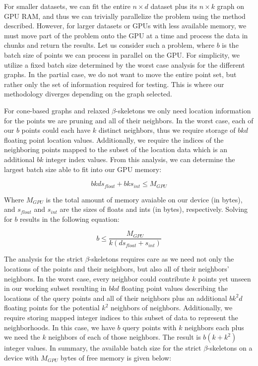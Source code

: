 For smaller datasets, we can fit the entire $n \times d$ dataset plus its $n \times k$ graph on GPU RAM, and thus we can trivially parallelize the problem using the method described.
%
However, for larger datasets or GPUs with less available memory, we must move part of the problem onto the GPU at a time and process the data in chunks and return the results.
%
Let us consider such a problem, where $b$ is the batch size of points we can process in parallel on the GPU.
%
For simplicity, we utilize a fixed batch size determined by the worst case analysis for the different graphs.
%
In the partial case, we do not want to move the entire point set, but rather only the set of information required for testing.
%
This is where our methodology diverges depending on the graph selected.

For cone-based graphs and relaxed $\beta$-skeletons we only need location information for the points we are pruning and all of their neighbors.
%
In the worst case, each of our $b$ points could each have $k$ distinct neighbors, thus we require storage of $bkd$ floating point location values.
%
Additionally, we require the indices of the neighboring points mapped to the subset of the location data which is an additional $bk$ integer index values.
%
From this analysis, we can determine the largest batch size able to fit into our GPU memory:

\begin{equation}
    bkds_{float} + bks_{int} \leq M_{GPU}
\end{equation}

Where $M_{GPU}$ is the total amount of memory avaiable on our device (in bytes), and $s_{float}$ and $s_{int}$ are the sizes of floats and ints (in bytes), respectively.
%
Solving for $b$ results in the following equation:

\begin{equation}
    b \leq \frac{M_{GPU}}{k(ds_{float} + s_{int})}
\end{equation}

The analysis for the strict $\beta$-skeletons requires care as we need not only the locations of the points and their neighbors, but also all of their neighbors' neighbors.
%
In the worst case, every neighbor could contribute $k$ points yet unseen in our working subset resulting in $bkd$ floating point values describing the locations of the query points and all of their neighbors plus an additional $bk^2d$ floating points for the potential $k^2$ neighbors of neighbors.
%
Additionally, we require storing mapped integer indices to this subset of data to represent the neighborhoods.
%
In this case, we have $b$ query points with $k$ neighbors each plus we need the $k$ neighbors of each of those neighbors.
%
The result is $b(k + k^2)$ integer values.
%
In summary, the available batch size for the strict $\beta$-skeletons on a device with $M_{GPU}$ bytes of free memory is given below:

